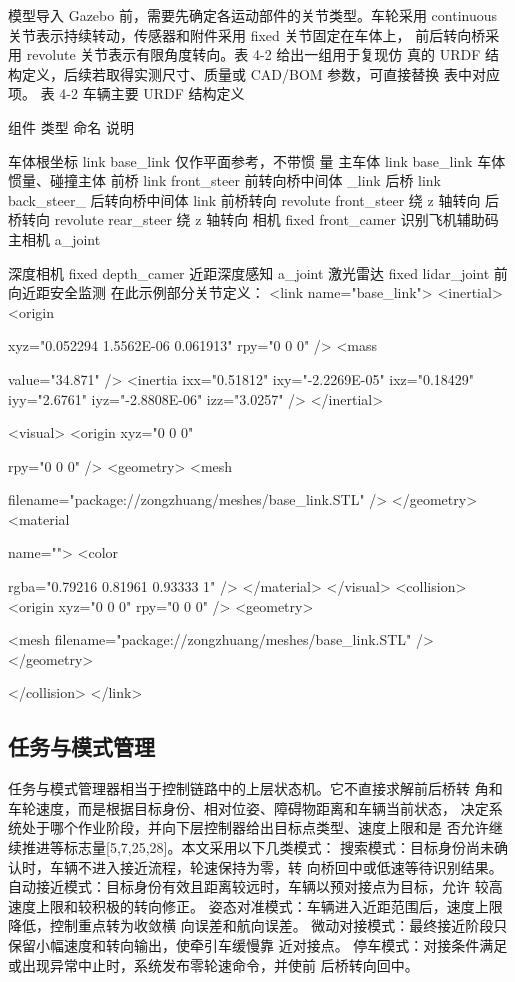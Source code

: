 模型导入 Gazebo 前，需要先确定各运动部件的关节类型。车轮采用
continuous 关节表示持续转动，传感器和附件采用 fixed 关节固定在车体上，
前后转向桥采用 revolute 关节表示有限角度转向。表 4-2 给出一组用于复现仿
真的 URDF 结构定义，后续若取得实测尺寸、质量或 CAD/BOM 参数，可直接替换
表中对应项。
表 4-2 车辆主要 URDF 结构定义

组件         类型           命名            说明

车体根坐标        link      base\_link    仅作平面参考，不带惯
量
主车体         link      base\_link    车体惯量、碰撞主体
前桥         link     front\_steer    前转向桥中间体
\_link
后桥         link     back\_steer\_    后转向桥中间体
link
前桥转向      revolute   front\_steer     绕 z 轴转向
后桥转向      revolute    rear\_steer     绕 z 轴转向
相机        fixed     front\_camer   识别飞机辅助码主相机
a\_joint









深度相机                   fixed     depth\_camer    近距深度感知
a\_joint
激光雷达                   fixed     lidar\_joint   前向近距安全监测
在此示例部分关节定义：
<link
name="base\_link">
<inertial>
<origin

xyz="0.052294 1.5562E-06 0.061913"
rpy="0 0 0" />
<mass

value="34.871" />
<inertia
ixx="0.51812"
ixy="-2.2269E-05"
ixz="0.18429"
iyy="2.6761"
iyz="-2.8808E-06"
izz="3.0257" />
</inertial>

<visual>
<origin
xyz="0 0 0"

rpy="0 0 0" />
<geometry>
<mesh

filename="package://zongzhuang/meshes/base\_link.STL" />
</geometry>
<material

name="">
<color







rgba="0.79216 0.81961 0.93333 1" />
</material>
</visual>
<collision>
<origin
xyz="0 0 0"
rpy="0 0 0" />
<geometry>

<mesh
filename="package://zongzhuang/meshes/base\_link.STL" />
</geometry>

</collision>
</link>
\subsection{任务与模式管理}
任务与模式管理器相当于控制链路中的上层状态机。它不直接求解前后桥转
角和车轮速度，而是根据目标身份、相对位姿、障碍物距离和车辆当前状态，
决定系统处于哪个作业阶段，并向下层控制器给出目标点类型、速度上限和是
否允许继续推进等标志量[5,7,25,28]。本文采用以下几类模式：
搜索模式：目标身份尚未确认时，车辆不进入接近流程，轮速保持为零，转
向桥回中或低速等待识别结果。
自动接近模式：目标身份有效且距离较远时，车辆以预对接点为目标，允许
较高速度上限和较积极的转向修正。
姿态对准模式：车辆进入近距范围后，速度上限降低，控制重点转为收敛横
向误差和航向误差。
微动对接模式：最终接近阶段只保留小幅速度和转向输出，使牵引车缓慢靠
近对接点。
停车模式：对接条件满足或出现异常中止时，系统发布零轮速命令，并使前
后桥转向回中。




